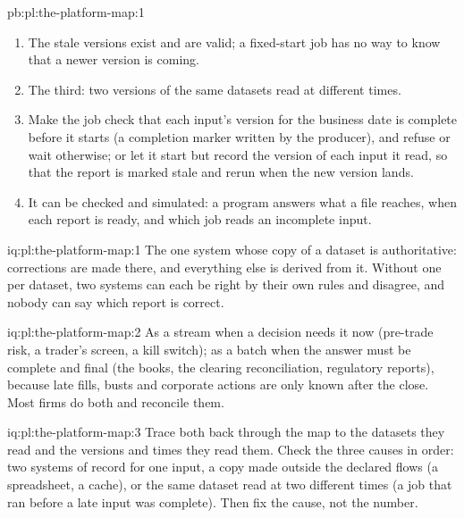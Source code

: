 \begin{solution}{pb:pl:the-platform-map:1}
\begin{enumerate}
\item The stale versions exist and are valid; a fixed-start job has no way to know that a newer version is coming.
\item The third: two versions of the same datasets read at different times.
\item Make the job check that each input's version for the business date is complete before it starts (a completion marker
written by the producer), and refuse or wait otherwise; or let it start but record the version of each input it read, so that
the report is marked stale and rerun when the new version lands.
\item It can be checked and simulated: a program answers what a file reaches, when each report is ready, and which job reads an
incomplete input.
\end{enumerate}
\end{solution}

\begin{solution}{iq:pl:the-platform-map:1}
The one system whose copy of a dataset is authoritative: corrections are made there, and everything else is derived from it.
Without one per dataset, two systems can each be right by their own rules and disagree, and nobody can say which report is
correct.
\end{solution}

\begin{solution}{iq:pl:the-platform-map:2}
As a stream when a decision needs it now (pre-trade risk, a trader's screen, a kill switch); as a batch when the answer must be
complete and final (the books, the clearing reconciliation, regulatory reports), because late fills, busts and corporate actions
are only known after the close. Most firms do both and reconcile them.
\end{solution}

\begin{solution}{iq:pl:the-platform-map:3}
Trace both back through the map to the datasets they read and the versions and times they read them. Check the three causes in
order: two systems of record for one input, a copy made outside the declared flows (a spreadsheet, a cache), or the same dataset
read at two different times (a job that ran before a late input was complete). Then fix the cause, not the number.
\end{solution}

